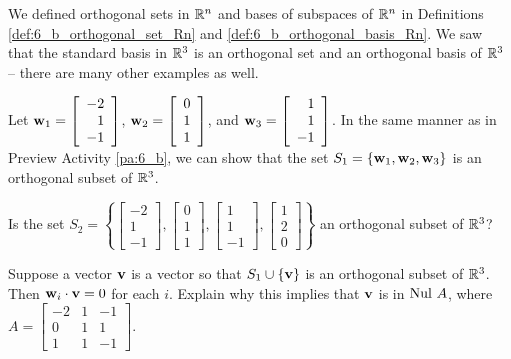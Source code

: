 \label{sec:orthog_sets}

We defined orthogonal sets in $\mathbb{R}^n$ and bases of subspaces of $\mathbb{R}^n$ in Definitions \ref{def:6_b_orthogonal_set_Rn} and \ref{def:6_b_orthogonal_basis_Rn}. We saw that the standard basis in $\mathbb{R}^3$ is an orthogonal set and an orthogonal basis of $\mathbb{R}^3$ -- there are many other examples as well.



\begin{activity} \label{act:6_b_orthog} Let $\mathbf{w}_1 = \left[ \begin{array}{r} -2 \\ 1 \\ -1 \end{array} \right]$, $\mathbf{w}_2 = \left[ \begin{array}{r} 0 \\ 1 \\ 1 \end{array} \right]$, and $\mathbf{w}_3 = \left[ \begin{array}{r} 1 \\ 1 \\ -1 \end{array} \right]$. In the same manner as in Preview Activity \ref{pa:6_b}, we can show that the set $S_1 = \left\{ \mathbf{w}_1, \mathbf{w}_2, \mathbf{w}_3  \right\}$ is an orthogonal subset of $\mathbb{R}^3$. 
	\ba
	\item Is the set $S_2 = \left\{ \left[ \begin{array}{r} -2 \\ 1 \\ -1 \end{array} \right], \left[ \begin{array}{r} 0 \\ 1 \\ 1 \end{array} \right], \left[ \begin{array}{r} 1 \\ 1 \\ -1 \end{array} \right], \left[ \begin{array}{r} 1 \\ 2 \\ 0 \end{array} \right] \right\}$ an orthogonal subset of $\mathbb{R}^3$?
	
	

	\item Suppose a vector $\mathbf{v}$ is a vector so that $S_1 \cup \{\mathbf{v}\}$ is an orthogonal subset of $\mathbb{R}^3$. Then $\mathbf{w}_i \cdot \mathbf{v} = 0$ for each $i$. Explain why this implies that $\mathbf{v}$ is in $\text{Nul } A$, where $A =  \left[ \begin{array}{rcr} -2&1&-1 \\ 0&1&1 \\ 1&1&-1 \end{array} \right]$. 
	

\end{activity}
